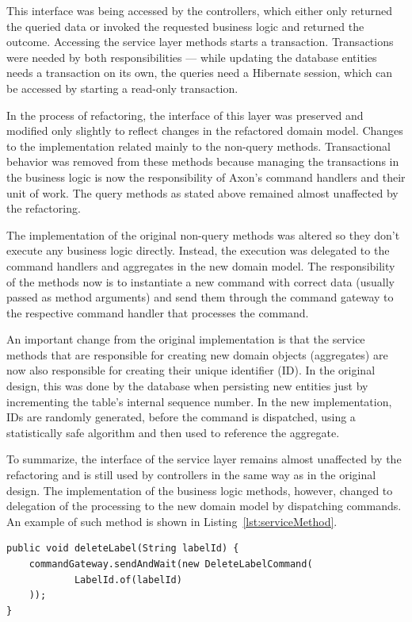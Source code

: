 \documentclass{book}
\begin{document}
This interface was being accessed by the controllers, which either only
returned the queried data or invoked the requested business logic and
returned the outcome. Accessing the service layer methods starts a
transaction. Transactions were needed by both responsibilities --- while
updating the database entities needs a transaction on its own, the
queries need a Hibernate session, which can be accessed by starting a
read-only transaction.

In the process of refactoring, the interface of this layer was preserved
and modified only slightly to reflect changes in the refactored domain
model. Changes to the implementation related mainly to the non-query
methods. Transactional behavior was removed from these methods because
managing the transactions in the business logic is now the
responsibility of Axon's command handlers and their unit of work. The
query methods as stated above remained almost unaffected by the
refactoring.

The implementation of the original non-query methods was altered so they
don't execute any business logic directly. Instead, the execution was
delegated to the command handlers and aggregates in the new domain
model. The responsibility of the methods now is to instantiate a new
command with correct data (usually passed as method arguments) and send
them through the command gateway to the respective command handler that
processes the command.

An important change from the original implementation is that the service
methods that are responsible for creating new domain objects
(aggregates) are now also responsible for creating their unique
identifier (ID). In the original design, this was done by the database
when persisting new entities just by incrementing the table's internal
sequence number. In the new implementation, IDs are randomly generated,
before the command is dispatched, using a statistically safe algorithm
and then used to reference the aggregate.

To summarize, the interface of the service layer remains almost
unaffected by the refactoring and is still used by controllers in the
same way as in the original design. The implementation of the business
logic methods, however, changed to delegation of the processing to the
new domain model by dispatching commands. An example of such method is
shown in Listing~\ref{lst:serviceMethod}.

\begin{lstlisting}[caption={An example of a business-logic service method after refactoring},label={lst:serviceMethod},captionpos=b,float,floatplacement=H]
public void deleteLabel(String labelId) {
    commandGateway.sendAndWait(new DeleteLabelCommand(
            LabelId.of(labelId)
    ));
}
\end{lstlisting}
\end{document}
